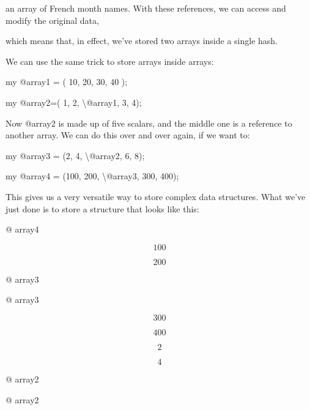 \documentclass[a4paper,11pt]{book}
\begin{document}
\noindent an array of French month names. With these references, we can access and modify the original data,

\noindent which means that, in effect, we've stored two arrays inside a single hash.

\noindent 

\noindent 

\noindent We can use the same trick to store arrays inside arrays:

\noindent 

\noindent 

\noindent my @array1 = ( 10, 20, 30, 40 );

\noindent my @array2=( 1, 2, \textbackslash @array1, 3, 4);

\noindent 

\noindent Now @array2 is made up of five scalars, and the middle one is a reference to another array. We can do this over and over again, if we want to:

\noindent 

\noindent 

\noindent my @array3 = (2, 4, \textbackslash @array2, 6, 8);

\noindent my @array4 = (100, 200, \textbackslash @array3, 300, 400);

\noindent 

\noindent This gives us a very versatile way to store complex data structures. What we've just done is to store a structure that looks like this:

\noindent 

\noindent 

\noindent @ array4

\noindent 

\[100\] 


\[200\] 


\noindent @ array3

\noindent 

\noindent @ array3

\noindent 

\[300\] 


\[400\] 


\[2\] 


\[4\] 


\noindent @ array2

\noindent 

\noindent 

\noindent 

\noindent @ array2

\noindent 
\end{document}
